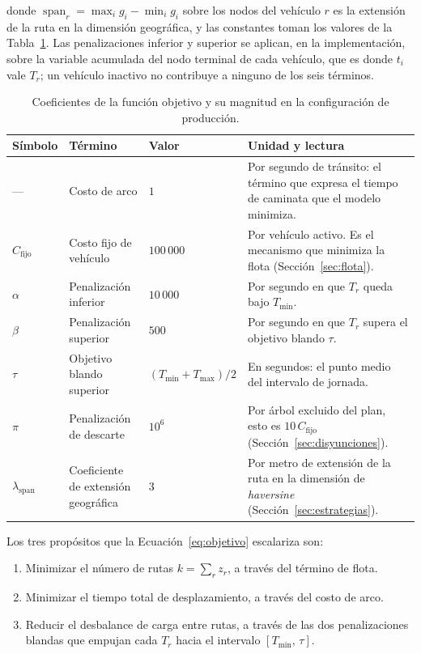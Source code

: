donde $\operatorname{span}_r = \max_i g_i - \min_i g_i$ sobre los nodos del
vehículo $r$ es la extensión de la ruta en la dimensión geográfica, y las
constantes toman los valores de la Tabla~\ref{tab:coeficientes}. Las penalizaciones
inferior y superior se aplican, en la implementación, sobre la variable acumulada
del nodo terminal de cada vehículo, que es donde $t_i$ vale $T_r$; un vehículo
inactivo no contribuye a ninguno de los seis términos.

\begin{table}[H]
  \centering
  \caption{Coeficientes de la función objetivo y su magnitud en la configuración de producción.}
  \label{tab:coeficientes}
  \small
  \begin{tabularx}{\textwidth}{@{}l l l X@{}}
    \toprule
    Símbolo & Término & Valor & Unidad y lectura \\
    \midrule
    --- & Costo de arco & $1$ & Por segundo de tránsito: el término que expresa el tiempo de caminata que el modelo minimiza. \\
    $C_{\text{fijo}}$ & Costo fijo de vehículo & $100\,000$ & Por vehículo activo. Es el mecanismo que minimiza la flota (Sección~\ref{sec:flota}). \\
    $\alpha$ & Penalización inferior & $10\,000$ & Por segundo en que $T_r$ queda bajo $T_{\min}$. \\
    $\beta$ & Penalización superior & $500$ & Por segundo en que $T_r$ supera el objetivo blando $\tau$. \\
    $\tau$ & Objetivo blando superior & $(T_{\min}+T_{\max})/2$ & En segundos: el punto medio del intervalo de jornada. \\
    $\pi$ & Penalización de descarte & $10^{6}$ & Por árbol excluido del plan, esto es $10\,C_{\text{fijo}}$ (Sección~\ref{sec:disyunciones}). \\
    $\lambda_{\text{span}}$ & Coeficiente de extensión geográfica & $3$ & Por metro de extensión de la ruta en la dimensión de \textit{haversine} (Sección~\ref{sec:estrategias}). \\
    \bottomrule
  \end{tabularx}
\end{table}

Los tres propósitos que la Ecuación~\ref{eq:objetivo} escalariza son:

\renewcommand{\labelenumi}{\alph{enumi})}
\begin{enumerate}
  \item Minimizar el número de rutas $k = \sum_r z_r$, a través del término de flota.
  \item Minimizar el tiempo total de desplazamiento, a través del costo de arco.
  \item Reducir el desbalance de carga entre rutas, a través de las dos penalizaciones
        blandas que empujan cada $T_r$ hacia el intervalo $[T_{\min},\,\tau]$.
\end{enumerate}
\renewcommand{\labelenumi}{\arabic{enumi}.}

